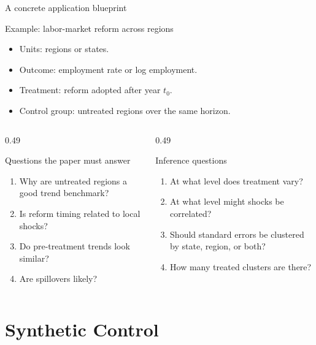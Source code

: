 \documentclass[10pt]{beamer}
\begin{document}
\begin{frame}{A concrete application blueprint}
\label{slide:did_app}
\small
\begin{block}{Example: labor-market reform across regions}
\begin{itemize}
  \item Units: regions or states.
  \item Outcome: employment rate or log employment.
  \item Treatment: reform adopted after year $t_0$.
  \item Control group: untreated regions over the same horizon.
\end{itemize}
\end{block}

\begin{columns}[T]
\begin{column}{0.49\textwidth}
\begin{exampleblock}{Questions the paper must answer}
\begin{enumerate}
  \item Why are untreated regions a good trend benchmark?
  \item Is reform timing related to local shocks?
  \item Do pre-treatment trends look similar?
  \item Are spillovers likely?
\end{enumerate}
\end{exampleblock}
\end{column}
\begin{column}{0.49\textwidth}
\begin{exampleblock}{Inference questions}
\begin{enumerate}
  \item At what level does treatment vary?
  \item At what level might shocks be correlated?
  \item Should standard errors be clustered by state, region, or both?
  \item How many treated clusters are there?
\end{enumerate}
\end{exampleblock}
\end{column}
\end{columns}
\end{frame}

\section{Synthetic Control}
\end{document}
